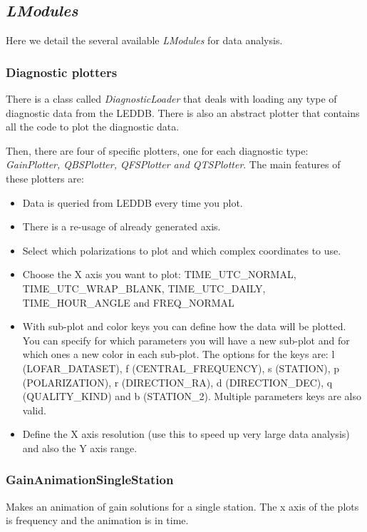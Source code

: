 \documentclass[a4paper,11pt]{article}
\begin{document}
\subsection{\textit{LModules}}

Here we detail the several available \textit{LModules} for data analysis. 

\subsubsection*{Diagnostic plotters}

There is a class called \textit{DiagnosticLoader} that deals with loading any type of diagnostic data from the LEDDB. There is also an abstract plotter that contains all the code to plot the diagnostic data.

Then, there are four of specific plotters, one for each diagnostic type: \textit{GainPlotter, QBSPlotter, QFSPlotter and QTSPlotter}. The main features of these plotters are:

\begin{itemize}
\item Data is queried from LEDDB every time you plot.
\item There is a re-usage of already generated axis.
\item Select which polarizations to plot and which complex coordinates to use.
\item Choose the X axis you want to plot: TIME\_UTC\_NORMAL, TIME\_UTC\_WRAP\_BLANK, TIME\_UTC\_DAILY, TIME\_HOUR\_ANGLE and FREQ\_NORMAL
\item With sub-plot and color keys you can define how the data will be plotted. You can specify for which parameters you will have a new sub-plot and for which ones a new color in each sub-plot. The options for the keys are: l (LOFAR\_DATASET), f (CENTRAL\_FREQUENCY), s (STATION), p (POLARIZATION), r (DIRECTION\_RA), d (DIRECTION\_DEC), q (QUALITY\_KIND) and b (STATION\_2). Multiple parameters keys are also valid.
\item Define the X axis resolution (use this to speed up very large data analysis) and also the Y axis range.
\end{itemize}

\subsubsection*{GainAnimationSingleStation}

Makes an animation of gain solutions for a single station. The x axis of the plots is frequency and the animation is in time.
\end{document}
